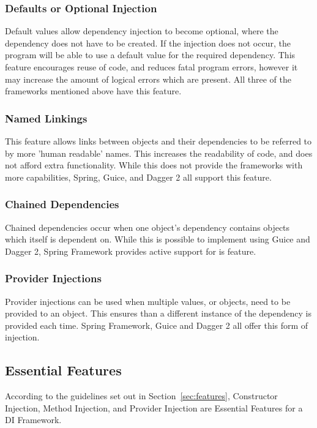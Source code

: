 \documentclass[12pt,twocolumn]{IEEEtran}
\begin{document}
\subsubsection{Defaults or Optional Injection} %
Default values allow dependency injection to become optional, where the dependency does not have to be created. If the injection does not occur, the program will be able to use a default value for the required dependency. This feature encourages reuse of code, and reduces fatal program errors, however it may increase the amount of logical errors which are present. All three of the frameworks mentioned above have this feature.

\subsubsection{Named Linkings} %
This feature allows links between objects and their dependencies to be referred to by more 'human readable' names. This increases the readability of code, and does not afford extra functionality. While this does not provide the frameworks with more capabilities, Spring, Guice, and Dagger 2 all support this feature.

\subsubsection{Chained Dependencies} %
Chained dependencies occur when one object's dependency contains objects which itself is dependent on. While this is possible to implement using Guice and Dagger 2, Spring Framework provides active support for is feature.

\subsubsection{Provider Injections} %
Provider injections can be used when multiple values, or objects, need to be provided to an object. This ensures than a different instance of the dependency is provided each time. Spring Framework, Guice and Dagger 2 all offer this form of injection. 

\subsection{Essential Features}
According to the guidelines set out in Section~\ref{sec:features}, Constructor Injection, Method Injection, and Provider Injection are Essential Features for a DI Framework.
\end{document}
